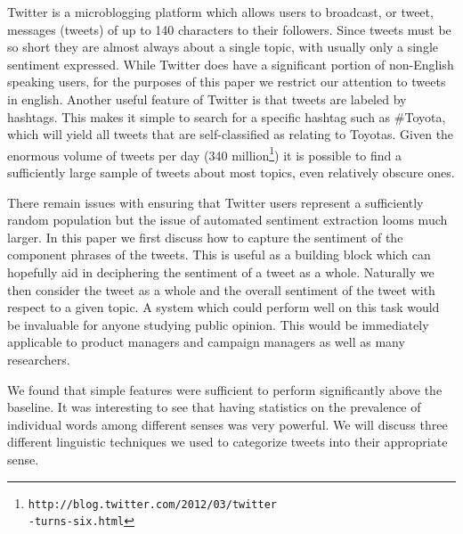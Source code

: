 \documentclass[11pt]{article}
\begin{document}
Twitter is a microblogging platform which allows users to broadcast, or tweet, messages (tweets) of up to 140 characters to their followers. Since tweets must be so short they are almost always about a single topic, with usually only a single sentiment expressed. While Twitter does have a significant portion of non-English speaking users, for the purposes of this paper we restrict our attention to tweets in english. Another useful feature of Twitter is that tweets are labeled by hashtags. This makes it simple to search for a specific hashtag such as \#Toyota, which will yield all tweets that are self-classified as relating to Toyotas. Given the enormous volume of tweets per day (340 million\footnote{{\tt http://blog.twitter.com/2012/03/twitter{\\}-turns-six.html}}) it is possible to find a sufficiently large sample of tweets about most topics, even relatively obscure ones.

There remain issues with ensuring that Twitter users represent a sufficiently random population but the issue of automated sentiment extraction looms much larger. In this paper we first discuss how to capture the sentiment of the component phrases of the tweets. This is useful as a building block which can hopefully aid in deciphering the sentiment of a tweet as a whole. Naturally we then consider the tweet as a whole and the overall sentiment of the tweet with respect to a given topic. A system which could perform well on this task would be invaluable for anyone studying public opinion. This would be immediately applicable to product managers and campaign managers as well as many researchers.

We found that simple features were sufficient to perform significantly above the baseline. It was interesting to see that having statistics on the prevalence of individual words among different senses was very powerful. We will discuss three different linguistic techniques we used to categorize tweets into their appropriate sense.
\end{document}
